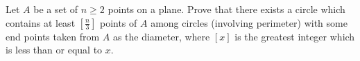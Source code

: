 Let $ A$ be a set of $ n\geq 2$ points on a plane. Prove that there exists a circle which contains at least $ \left[\frac{n}{3}\right]$ points of $ A$ among circles (involving perimeter) with some end points taken from $ A$ as the diameter, where $ [x]$ is the greatest integer which is less than or equal to $ x$.